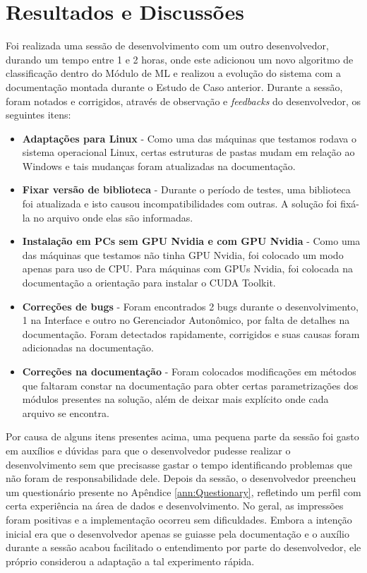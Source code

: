 \documentclass[portugues]{ic-tese}
\begin{document}
\section{Resultados e Discussões}

Foi realizada uma sessão de desenvolvimento com um outro desenvolvedor, durando um tempo entre 1 e 2 horas, onde este adicionou um novo algoritmo de classificação dentro do Módulo de ML e realizou a evolução do sistema com a documentação montada durante o Estudo de Caso anterior. Durante a sessão, foram notados e corrigidos, através de observação e \textit{feedbacks} do desenvolvedor, os seguintes itens:

\begin{itemize}
\item \textbf{Adaptações para Linux} - Como uma das máquinas que testamos rodava o sistema operacional Linux, certas estruturas de pastas mudam em relação ao Windows e tais mudanças foram atualizadas na documentação.
\item \textbf{Fixar versão de biblioteca} - Durante o período de testes, uma biblioteca foi atualizada e isto causou incompatibilidades com outras. A solução foi fixá-la no arquivo onde elas são informadas.
\item \textbf{Instalação em PCs sem GPU Nvidia e com GPU Nvidia} - Como uma das máquinas que testamos não tinha GPU Nvidia, foi colocado um modo apenas para uso de CPU. Para máquinas com GPUs Nvidia, foi colocada na documentação a orientação para instalar o CUDA Toolkit.
\item \textbf{Correções de bugs} - Foram encontrados 2 bugs durante o desenvolvimento, 1 na Interface e outro no Gerenciador Autonômico, por falta de detalhes na documentação. Foram detectados rapidamente, corrigidos e suas causas foram adicionadas na documentação.
\item \textbf{Correções na documentação} - Foram colocados modificações em métodos que faltaram constar na documentação para obter certas parametrizações dos módulos presentes na solução, além de deixar mais explícito onde cada arquivo se encontra.
\end{itemize}

Por causa de alguns itens presentes acima, uma pequena parte da sessão foi gasto em auxílios e dúvidas para que o desenvolvedor pudesse realizar o desenvolvimento sem que precisasse gastar o tempo identificando problemas que não foram de responsabilidade dele. Depois da sessão, o desenvolvedor preencheu um questionário presente no Apêndice \ref{ann:Questionary}, refletindo um perfil com certa experiência na área de dados e desenvolvimento. No geral, as impressões foram positivas e a implementação ocorreu sem dificuldades. Embora a intenção inicial era que o desenvolvedor apenas se guiasse pela documentação e o auxílio durante a sessão acabou facilitado o entendimento por parte do desenvolvedor, ele próprio considerou a adaptação a tal experimento rápida.
\end{document}
